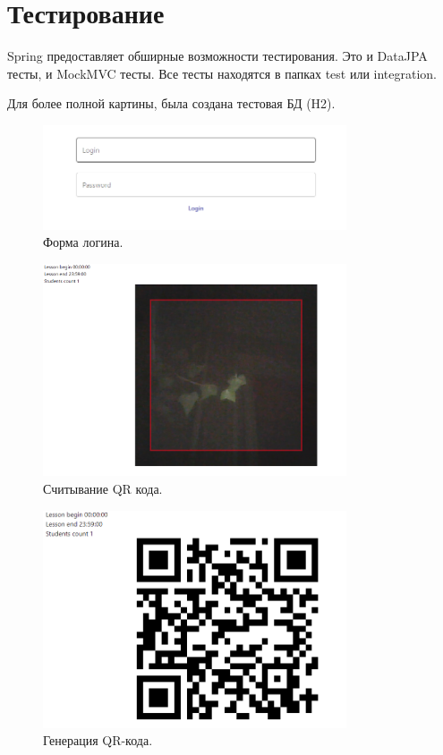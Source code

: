 \section{Тестирование}

Spring предоставляет обширные возможности тестирования.
Это и DataJPA тесты, и MockMVC тесты.
Все тесты находятся в папках test или integration.

Для более полной картины, была создана тестовая БД (H2).

\begin{figure}[ht]
    \centering
    \includegraphics[width=0.8\textwidth]{../resources/login.png}
    \caption{Форма логина.}
\end{figure}

\begin{figure}[ht]
    \centering
    \includegraphics[width=0.8\textwidth]{../resources/read.PNG}
    \caption{Считывание QR кода.}
\end{figure}

\begin{figure}[ht]
    \centering
    \includegraphics[width=0.8\textwidth]{../resources/write.PNG}
    \caption{Генерация QR-кода.}
\end{figure}

